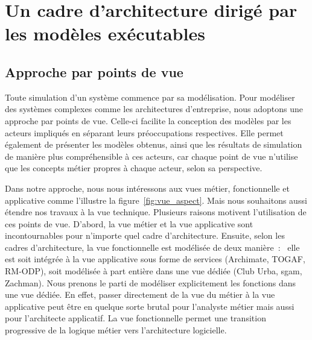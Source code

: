 \section{Un cadre d'architecture dirigé par les modèles exécutables}

\subsection{Approche par points de vue}

Toute simulation d'un système commence par sa modélisation. Pour modéliser des
systèmes complexes comme les architectures d'entreprise, nous adoptons une
approche par points de vue. Celle-ci facilite la conception des modèles par les
acteurs impliqués en séparant leurs préoccupations respectives. Elle permet
également de présenter les modèles obtenus, ainsi que les résultats de
simulation de manière plus compréhensible à ces acteurs, car chaque point de vue
n'utilise que les concepts métier propres à chaque acteur, selon sa perspective.

Dans notre approche, nous nous intéressons aux vues métier, fonctionnelle et
applicative comme l'illustre la figure~\ref{fig:vue_aspect}. Mais nous
souhaitons aussi étendre nos travaux à la vue technique. Plusieurs raisons
motivent l'utilisation de ces points de vue. D'abord, la vue métier et la vue
applicative sont incontournables pour n'importe quel cadre d'architecture.
Ensuite, selon les cadres d'architecture, la vue fonctionnelle est modélisée de
deux manière~:~ elle est soit intégrée à la vue applicative sous forme de
services (Archimate, TOGAF, RM-ODP), soit modélisée à part entière dans une vue
dédiée (Club Urba, \gls{sgam}, Zachman). Nous prenons le parti de modéliser
explicitement les fonctions dans une vue dédiée. En effet, passer directement
de la vue du métier à la vue applicative peut être en quelque sorte brutal pour
l'analyste métier mais aussi pour l'architecte applicatif. La vue fonctionnelle
permet une transition progressive de la logique métier vers l'architecture
logicielle.

